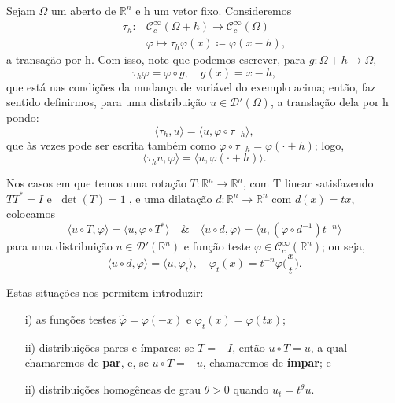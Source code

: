 \documentclass[../distribution_theory_notes.tex]{subfiles}
\begin{document}
\begin{example}
	Sejam \(\Omega \) um aberto de \(\mathbb{R}^{n}\) e h um vetor fixo. Consideremos
	\begin{align*}
		\tau_h: & \mathcal{C}_{c}^{\infty}(\Omega +h)\rightarrow \mathcal{C}_{c}^{\infty}(\Omega ) \\
		        & \varphi \longmapsto \tau_h\varphi (x)\coloneqq \varphi (x-h),
	\end{align*}
	a transação por h. Com isso, note que podemos escrever, para \(g:\Omega +h\rightarrow \Omega \),
	\[
		\tau_h\varphi = \varphi \circ g, \quad g(x)=x-h,
	\]
	que está nas condições da mudança de variável do exemplo acima; então, faz sentido definirmos, para uma distribuição \(u\in \mathcal{D}'(\Omega )\), a translação dela por h pondo:
	\[
		\langle \tau_h, u \rangle = \langle u, \varphi \circ \tau_{-h} \rangle,
	\]
	que às vezes pode ser escrita também como \(\varphi \circ \tau_{-h}=\varphi (\cdot +h)\); logo,
	\[
		\langle \tau_hu, \varphi  \rangle = \langle u, \varphi (\cdot +h) \rangle.
	\]

	Nos casos em que temos uma rotação \(T:\mathbb{R}^{n}\rightarrow \mathbb{R}^{n}\), com T linear satisfazendo \(TT^{*}= I\) e \(| \det{(T)} = 1 |\), e uma dilatação \(d:\mathbb{R}^{n}\rightarrow \mathbb{R}^{n}\) com \(d(x)=tx\), colocamos
	\[
		\langle u \circ T, \varphi  \rangle= \langle u, \varphi \circ T^{*} \rangle \quad\&\quad \langle u\circ d, \varphi  \rangle = \langle u, (\varphi \circ d^{-1})t^{-n} \rangle
	\]
	para uma distribuição \(u\in \mathcal{D}'(\mathbb{R}^{n})\) e função teste \(\varphi \in \mathcal{C}_{c}^{\infty}(\mathbb{R}^{n})\); ou seja,
	\[
		\langle u\circ d, \varphi  \rangle = \langle u, \varphi_{t} \rangle,\quad \varphi_{t}(x)=t^{-n}\varphi \biggl(\frac{x}{t}\biggr).
	\]

	Estas situações nos permitem introduzir:
	\begin{itemize}
		\item[i)] as funções testes \(\hat{\varphi }=\varphi (-x)\) e \(\varphi_{t}(x)=\varphi (tx)\);
		\item[ii)] distribuições pares e ímpares: se \(T=-I\), então \(u\circ T = u\), a qual chamaremos de \textbf{par}, e, se \(u\circ T=-u\), chamaremos de \textbf{ímpar}; e
		\item[ii)] distribuições homogêneas de grau \(\theta >0\) quando \(u_{t}=t^{\theta }u.\)
	\end{itemize}

\end{example}
\end{document}
